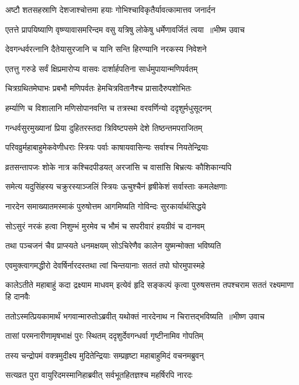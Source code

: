 \twolineshloka
{अष्टौ शतसहस्राणि देशजाश्चोत्तमा हयाः}
{गोभिश्चाविकृतैर्यावत्कामात्तव जनार्दन}


\threelineshloka
{एतत्ते प्रापयिष्याणि वृष्ण्यावासमरिन्दम}
{वसु यत्रिषु लोकेषु धर्मेणावर्जितं त्वया ॥भीष्म उवाच}
{}


\twolineshloka
{देवगन्धर्वरत्नानि दैतेयासुरजानि च}
{यानि सन्ति हिरण्यानि नरकस्य निवेशने}


\twolineshloka
{एतत्तु गरुडे सर्वं क्षिप्रमारोप्य वासवः}
{दार्शार्हपतिना सार्धमुपायान्मणिपर्वतम्}


\twolineshloka
{चित्रग्रथितमेघाभः प्रबभौ मणिपर्वतः}
{हेमचित्रवितानैश्च प्रासादैरुपशोभितः}


\twolineshloka
{हर्म्याणि च विशालानि मणिसोपानवन्ति च}
{तत्रस्था वरवर्णिन्यो ददृशुर्मधुसूदनम्}


\twolineshloka
{गन्धर्वसुरमुख्यानां प्रिया दुहितरस्तदा}
{त्रिविष्टपसमे देशे तिष्ठन्तमपराजितम्}


\twolineshloka
{परिवव्रुर्महाबाहुमेकवेणीधराः स्त्रियः}
{पर्वाः काषायवासिन्यः सर्वाश्च नियतेन्द्रियाः}


\twolineshloka
{व्रतसन्तापजः शोके नात्र कश्चिदपीडयत्}
{अरजांसि च वासांसि बिभ्रत्यः कौशिकान्यपि}


\twolineshloka
{समेत्य यदुसिंहस्य चक्रुरस्याञ्जलिं स्त्रियः}
{ऊचुश्चैनं हृषीकेशं सर्वास्ताः कमलेक्षणाः}


\twolineshloka
{नारदेन समाख्यातमस्माकं पुरुषोत्तम}
{आगमिष्यति गोविन्दः सुरकार्यार्थसिद्धये}


\twolineshloka
{सोऽसुरं नरकं हत्वा निशुम्भं मुरमेव च}
{भौमं च सपरीवारं हयग्रीवं च दानवम्}


\twolineshloka
{तथा पञ्चजनं चैव प्राप्स्यते धनमक्षयम्}
{सोऽचिरेणैव कालेन युष्मन्मोक्ता भविष्यति}


\twolineshloka
{एवमुक्त्वागमद्धीरो देवर्षिर्नारदस्तथा}
{त्वां चिन्तयानाः सततं तपो घोरमुपास्महे}


\threelineshloka
{कालेऽतीते महाबाहुं कदा द्रक्ष्याम माधवम्}
{इत्येवं हृदि सङ्कल्पं कृत्वा पुरुषसत्तम}
{तपश्चराम सततं रक्ष्यमाणा हि दानवैः}


\twolineshloka
{ततोऽस्मत्प्रियकामार्थं भगवान्मारुतोऽब्रवीत्}
{यथोक्तं नारदेनाथ न चिरात्तद्भविष्यति ॥भीष्ण उवाच}


\twolineshloka
{तासां परमनारीणामृषभाक्षं पुरः स्थितम्}
{ददृशुर्देवगन्धर्वा गृष्टीनामिव गोपतिम्}


\threelineshloka
{तस्य चन्द्रोपमं वक्त्रमुदीक्ष्य मुदितेन्द्रियाः}
{सम्प्रहृष्टा महाबाहुमिदं वचनमब्रुवन्}
{}


\twolineshloka
{सत्यव्रत पुरा वायुरिदमस्मानिहाब्रवीत्}
{सर्वभूतहितज्ञश्च महर्षिरपि नारदः}


